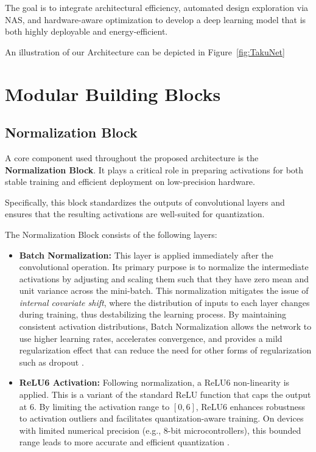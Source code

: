 The goal is to integrate architectural efficiency, automated design exploration via NAS, and hardware-aware optimization to develop a deep learning model that is both highly deployable and energy-efficient.

An illustration of our Architecture can be depicted in Figure~\ref{fig:TakuNet}

\section{Modular Building Blocks}


\subsection{Normalization Block}

\begin{sloppypar}
A core component used throughout the proposed architecture is the \textbf{Normalization Block}. It plays a critical role in preparing activations for both stable training and efficient deployment on low-precision hardware.
\end{sloppypar}

Specifically, this block standardizes the outputs of convolutional layers and ensures that the resulting activations are well-suited for quantization.


The Normalization Block consists of the following layers:

\begin{itemize}

    \item \textbf{Batch Normalization:} This layer is applied immediately after the convolutional operation. Its primary purpose is to normalize the intermediate activations by adjusting and scaling them such that they have zero mean and unit variance across the mini-batch. This normalization mitigates the issue of \textit{internal covariate shift}, where the distribution of inputs to each layer changes during training, thus destabilizing the learning process. By maintaining consistent activation distributions, Batch Normalization allows the network to use higher learning rates, accelerates convergence, and provides a mild regularization effect that can reduce the need for other forms of regularization such as dropout \cite{BatchNorm}.

    
    \item \textbf{ReLU6 Activation:} Following normalization, a ReLU6 non-linearity is applied. This is a variant of the standard ReLU function that caps the output at 6. By limiting the activation range to $[0, 6]$, ReLU6 enhances robustness to activation outliers and facilitates quantization-aware training. On devices with limited numerical precision (e.g., 8-bit microcontrollers), this bounded range leads to more accurate and efficient quantization \cite{ConvNetworksMobileNets}.
\end{itemize}

